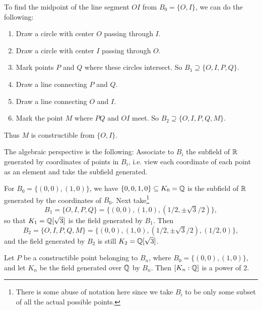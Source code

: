 \begin{example}
  To find the midpoint of the line segment $OI$
  from $B_0 = \{O, I\}$, we can do the following:
  \begin{enumerate}
    \item Draw a circle with center $O$ passing
      through $I$.
    \item Draw a circle with center $I$ passing through
      $O$.
    \item Mark points $P$ and $Q$ where these circles
      intersect. So $B_1 \supseteq \{O, I, P, Q\}$.
    \item Draw a line connecting $P$ and $Q$.
    \item Draw a line connecting $O$ and $I$.
    \item Mark the point $M$ where $PQ$ and $OI$ meet.
      So $B_2 \supseteq \{O, I, P, Q, M\}$.
  \end{enumerate}
  Thus $M$ is constructible from $\{O, I\}$.
\end{example}

The algebraic perspective is the following: Associate
to $B_i$ the subfield of $\mathbb{R}$ generated by coordinates
of points in $B_i$, i.e. view each coordinate of
each point as an element and take the subfield
generated.
\begin{example}
For
$B_0 = \{(0, 0), (1, 0)\}$, we have $\{0, 0, 1, 0\} \subseteq K_0 = \mathbb{Q}$
is the subfield of $\mathbb{R}$ generated by the coordinates
of $B_0$. Next take\footnote{There is some abuse of notation here since we take $B_i$ to be only some subset of all the actual possible points.}
\[
  B_1 = \{O, I, P, Q\}
  = \{(0, 0), (1, 0), (1 / 2, \pm \sqrt{3} / 2)\},
\]
so that $K_1 = \mathbb{Q}[\sqrt{3}]$ is the field
generated by $B_1$. Then
\[
  B_2 = \{O, I, P, Q, M\} = \{(0, 0), (1, 0), (1 / 2, \pm \sqrt{3} / 2), (1 / 2, 0)\},
\]
and the field generated by $B_2$ is still $K_2 = \mathbb{Q}[\sqrt{3}]$.
\end{example}

\begin{theorem}
  Let $P$ be a constructible point belonging to $B_n$,
  where $B_0 = \{(0, 0), (1, 0)\}$, and let $K_n$
  be the field generated over $\mathbb{Q}$ by $B_n$. Then
  $[K_n : \mathbb{Q}]$ is a power of $2$.
\end{theorem}


